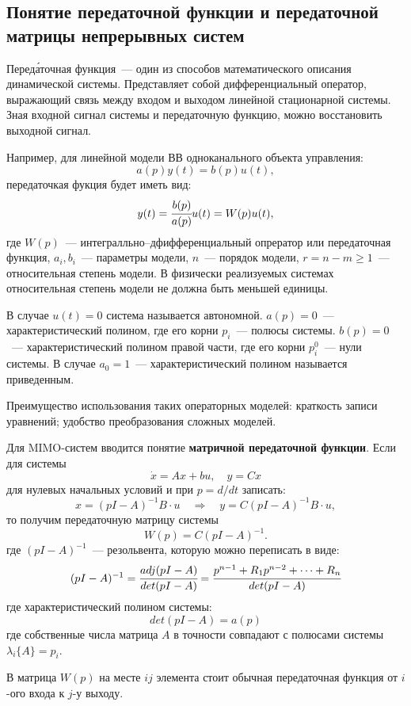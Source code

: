 \subsection{Понятие передаточной функции и передаточной матрицы непрерывных систем}

Переда́точная функция~--- один из способов математического описания динамической системы. Представляет собой дифференциальный оператор, выражающий связь между входом и выходом линейной стационарной системы. Зная входной сигнал системы и передаточную функцию, можно восстановить выходной сигнал.

Например, для линейной модели ВВ одноканального объекта управления:
\begin{equation}
    a(p) y(t) = b(p) u(t),
\end{equation}
передаточкая фукция будет иметь вид:
\begin{equation}
    y(t) = \cfrac{b(p)}{a(p)} u(t) = W(p) u(t),
\end{equation}
где $W(p)$~--- интегралльно--дфифференциальный опрератор или передаточная функция, $a_i, b_i$~--- параметры модели, $n$~--- порядок модели, $r = n - m \ge 1$~--- относительная степень модели. В физически реализуемых системах относительная степень модели не должна быть меньшей единицы.


В случае $u(t)=0$ система называется автономной. $a(p)=0$~--- характеристический полином, где его корни $p_i$~--- полюсы системы. $b(p)=0$~--- характеристический полином правой части, где его корни $p_i^0$~--- нули системы. В случае $a_0 = 1$~--- характеристический полином называется приведенным.

Преимущество использования таких операторных моделей: краткость записи уравнений; удобство преобразования сложных моделей.

Для MIMO-систем вводится понятие \textbf{матричной передаточной функции}. 
Если для системы
\begin{equation}
    \dot x = A x + b u, \quad y = C x
\end{equation}
для нулевых начальных условий и при $p = d/dt$ записать:
\begin{equation}
    x = (p I - A)^{-1} B \cdot u \quad\Rightarrow\quad y = C(p I - A)^{-1} B \cdot u,
\end{equation}
то получим передаточную матрицу системы 
\begin{equation}
    W(p) = C(p I - A)^{-1}.
\end{equation}
где $(p I - A)^{-1}$~--- резольвента, которую можно переписать в виде:
\begin{equation}
    (p I - A)^{-1} = \cfrac{adj(pI - A)}{det(pI - A)} = \cfrac{p^{n-1} + R_1 p^{n-2} + \dots + R_n}{det(pI - A)}
\end{equation}
где характеристический полином системы:
\begin{equation}
    det(pI - A) = a(p)
\end{equation}
где собственные числа матрица $A$ в точности совпадают с полюсами системы $\lambda_i\{A\} = p_i$.

В матрица $W(p)$ на месте $ij$ элемента стоит обычная передаточная функция от $i$-ого входа к $j$-у выходу.

